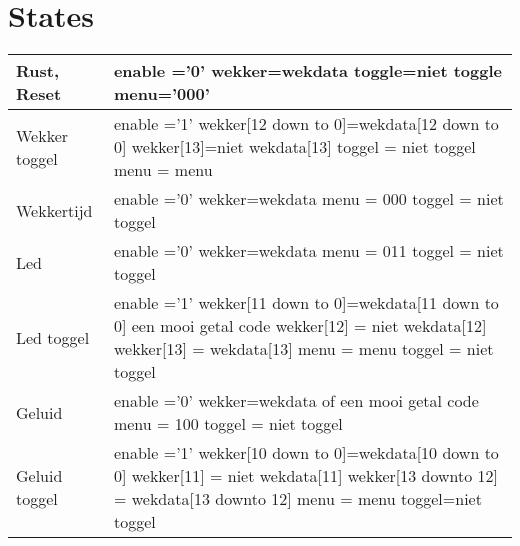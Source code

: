 \documentclass[a4paper, oneside, 10pt]{article}
\begin{document}
\section{States}
\begin{longtable}{|l| p{10cm} |}
\hline
Rust, Reset &
enable ='0' \newline
wekker=wekdata \newline
toggle=niet toggle \newline
menu='000' \\ \hline
Wekker toggel &
enable ='1' \newline
wekker[12 down to 0]=wekdata[12 down to 0] \newline
wekker[13]=niet wekdata[13] \newline
toggel = niet toggel \newline
menu = menu \\ \hline
Wekkertijd &
enable ='0' \newline
wekker=wekdata \newline
menu = 000 \newline
toggel = niet toggel \\ \hline
Led &
enable ='0' \newline
wekker=wekdata \newline
menu = 011 \newline
toggel = niet toggel \\ \hline
Led toggel &
enable ='1' \newline
wekker[11 down to 0]=wekdata[11 down to 0] een mooi getal code \newline
wekker[12] = niet wekdata[12] \newline
wekker[13] = wekdata[13] \newline
menu = menu \newline
toggel = niet toggel \\ \hline
Geluid & 
enable ='0' \newline
wekker=wekdata of een mooi getal code \newline
menu = 100 \newline
toggel = niet toggel \\ \hline
Geluid toggel &
enable ='1' \newline
wekker[10 down to 0]=wekdata[10 down to 0] \newline
wekker[11] = niet wekdata[11] \newline
wekker[13 downto 12] = wekdata[13 downto 12] \newline
menu = menu \newline
toggel=niet toggel \\ \hline

\end{longtable}
\end{document}

